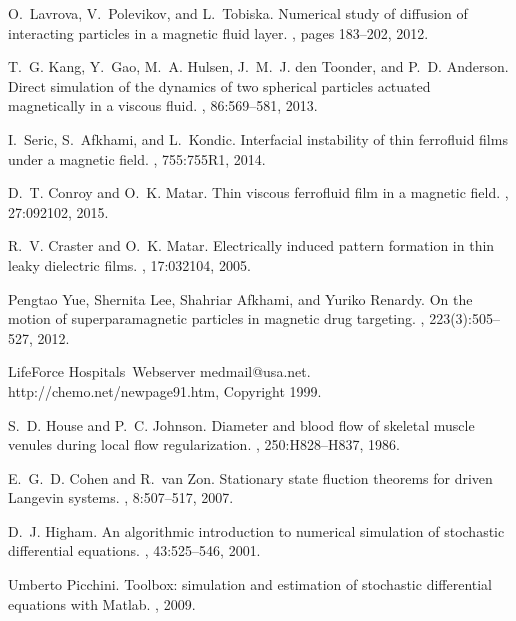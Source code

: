 \begin{thebibliography}{10}
O.~Lavrova, V.~Polevikov, and L.~Tobiska.
\newblock Numerical study of diffusion of interacting particles in a magnetic
  fluid layer.
, pages 183--202, 2012.

T.~G. Kang, Y.~Gao, M.~A. Hulsen, J.~M.~J. den Toonder, and P.~D. Anderson.
\newblock Direct simulation of the dynamics of two spherical particles actuated
  magnetically in a viscous fluid.
, 86:569--581, 2013.

I.~Seric, S.~Afkhami, and L.~Kondic.
\newblock Interfacial instability of thin ferrofluid films under a magnetic
  field.
, 755:755R1, 2014.

D.~T. Conroy and O.~K. Matar.
\newblock Thin viscous ferrofluid film in a magnetic field.
, 27:092102, 2015.

R.~V. Craster and O.~K. Matar.
\newblock Electrically induced pattern formation in thin leaky dielectric
  films.
, 17:032104, 2005.

Pengtao Yue, Shernita Lee, Shahriar Afkhami, and Yuriko Renardy.
\newblock On the motion of superparamagnetic particles in magnetic drug
  targeting.
, 223(3):505--527, 2012.

Life{F}orce Hospitals~Webserver medmail@usa.net.
\newblock http://chemo.net/newpage\-91.htm, Copyright 1999.

S.~D. House and P.~C. Johnson.
\newblock Diameter and blood flow of skeletal muscle venules during local flow
  regularization.
, 250:H828--H837, 1986.

E.~G.~D. Cohen and R.~{van Zon}.
\newblock Stationary state fluction theorems for driven {L}angevin systems.
, 8:507--517, 2007.

D.~J. Higham.
\newblock An algorithmic introduction to numerical simulation of stochastic
  differential equations.
, 43:525--546, 2001.

Umberto Picchini.
 {T}oolbox: simulation and estimation of stochastic
  differential equations with {M}atlab.
, 2009.


\end{thebibliography}
